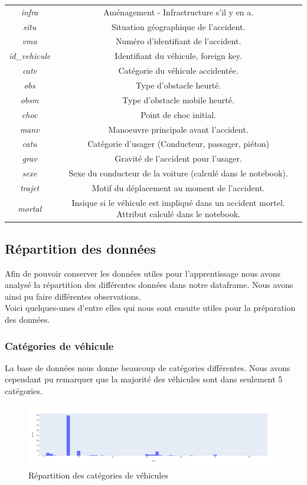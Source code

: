\documentclass[]{article}
\begin{document}
\begin{center}
\begin{tabular}{ |c|c| }
            \textit{infra} & Aménagement - Infrastructure s'il y en a. \\  
            \textit{situ} & Situation géographique de l'accident. \\  
            \textit{vma} & Numéro d'identifiant de l'accident. \\
            \textit{id_vehicule} & Identifiant du véhicule, foreign key. \\
            \textit{catv} & Catégorie du véhicule accidentée. \\  
            \textit{obs} & Type d'obstacle heurté. \\
            \textit{obsm} & Type d'obstacle mobile heurté. \\
            \textit{choc} & Point de choc initial. \\
            \textit{manv} & Manoeuvre principale avant l'accident. \\
            \textit{catu} & Catégorie d'usager (Conducteur, passager, piéton) \\
            \textit{grav} & Gravité de l'accident pour l'usager. \\
            \textit{sexe} & Sexe du conducteur de la voiture (calculé dans le notebook). \\
            \textit{trajet} & Motif du déplacement au moment de l’accident. \\
            \textit{mortal} & Insique si le véhicule est impliqué dans un accident mortel. Attribut calculé dans le notebook. \\
            \hline
        \end{tabular}
    \end{center}

    \subsection{Répartition des données}
    Afin de pouvoir conserver les données utiles pour l'apprentissage nous avons analysé la répartition des 
    différentes données dans notre dataframe.
    Nous avons ainsi pu faire différentes observations. 
    \\
    Voici quelques-unes d'entre elles qui nous sont ensuite
    utiles pour la préparation des données.
    \subsubsection{Catégories de véhicule}
    La base de données nous donne beaucoup de catégories différentes. Nous avons cependant pu remarquer 
    que la majorité des véhicules sont dans seulement 5 catégories.
    \begin{figure}[ht]
        \centering
        \includegraphics[width=12cm]{./img/catv1.png}
        \caption{Répartition des catégories de véhicules}
    \end{figure}
\end{document}
